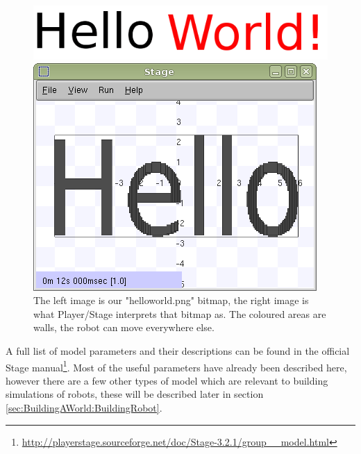 \documentclass[a4paper]{report}
\newcommand{\plst}{Player/Stage\xspace}
\begin{document}
\begin{figure}
	\centering
	\begin{minipage}[c]{0.4\linewidth}
		\centering
		\includegraphics[width=\linewidth]{./pics/empty_world/writing.png}
		
	\end{minipage}%
	\hspace{0.05\linewidth}
	\begin{minipage}[c]{0.5\linewidth}
		\centering
		\includegraphics[width=\linewidth]{./pics/empty_world/helloworld.png} 
	\end{minipage}	
	\caption{The left image is our "helloworld.png" bitmap, the right image is what \plst interprets that bitmap as. The coloured areas are walls, the robot can move everywhere else.}
		\label{fig:BuildingAWorld:EmptyWorld:Models:HelloWorld}
\end{figure}

A full list of model parameters and their descriptions can be found in the official Stage manual\footnote{\url{http://playerstage.sourceforge.net/doc/Stage-3.2.1/group__model.html}}. Most of the useful parameters have already been described here, however there are a few other types of model which are relevant to building simulations of robots, these will be described later in section \ref{sec:BuildingAWorld:BuildingRobot}.
\end{document}

